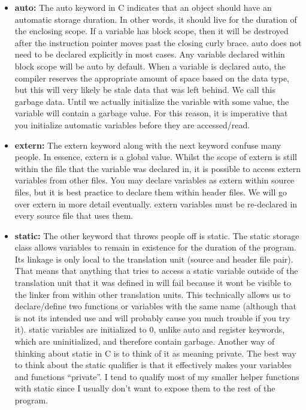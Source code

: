 \documentclass{article}
\begin{document}
\begin{itemize}

\item{%
    \textbf{auto:} The auto keyword in C indicates that an object should have an automatic storage duration.
    In other words, it should live for the duration of the enclosing scope. If a variable has block scope,
    then it will be destroyed after the instruction pointer moves past the closing curly brace. auto does not
    need to be declared explicitly in most cases. Any variable declared within block scope will be auto by
    default. When a variable is declared auto, the compiler reserves the appropriate amount of space based on
    the data type, but this will very likely be stale data that was left behind. We call this garbage data.
    Until we actually initialize the variable with some value, the variable will contain a garbage value. For
    this reason, it is imperative that you initialize automatic variables before they are accessed/read.
}

\item{%
    \textbf{extern:} The extern keyword along with the next keyword confuse many people. In essence, extern
    is a global value. Whilst the scope of extern is still within the file that the variable was declared in,
    it is possible to access extern variables from other files. You may declare variables as extern within
    source files, but it is best practice to declare them within header files. We will go over extern in more
    detail eventually. extern variables must be re-declared in every source file that uses them.
}

\item{%
    \textbf{static:} The other keyword that throws people off is static. The static storage class allows
    variables to remain in existence for the duration of the program. Its linkage is only local to the
    translation unit (source and header file pair). That means that anything that tries to access a static
    variable outside of the translation unit that it was defined in will fail because it wont be visible to
    the linker from within other translation units. This technically allows us to declare/define two functions
    or variables with the same name (although that is not its intended use and will probably cause you much
    trouble if you try it). static variables are initialized to 0, unlike auto and register keywords, which
    are uninitialized, and therefore contain garbage. Another way of thinking about static in C is to think of
    it as meaning private. The best way to think about the static qualifier is that it effectively makes your
    variables and functions “private”. I tend to qualify most of my smaller helper functions with static
    since I usually don’t want to expose them to the rest of the program.
}


\end{itemize}
\end{document}
